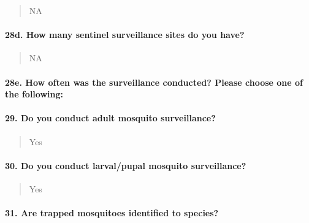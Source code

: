 \documentclass[
]{article}
\begin{document}
\begin{quote}
NA
\end{quote}

\hypertarget{d.-how-many-sentinel-surveillance-sites-do-you-have}{%
\paragraph{28d. How many sentinel surveillance sites do you
have?}\label{d.-how-many-sentinel-surveillance-sites-do-you-have}}

\begin{quote}
NA
\end{quote}

\hypertarget{e.-how-often-was-the-surveillance-conducted-please-choose-one-of-the-following}{%
\paragraph{28e. How often was the surveillance conducted? Please choose
one of the
following:}\label{e.-how-often-was-the-surveillance-conducted-please-choose-one-of-the-following}}

\begin{quote}
\end{quote}

\hypertarget{do-you-conduct-adult-mosquito-surveillance}{%
\paragraph{29. Do you conduct adult mosquito
surveillance?}\label{do-you-conduct-adult-mosquito-surveillance}}

\begin{quote}
Yes
\end{quote}

\hypertarget{do-you-conduct-larvalpupal-mosquito-surveillance}{%
\paragraph{30. Do you conduct larval/pupal mosquito
surveillance?}\label{do-you-conduct-larvalpupal-mosquito-surveillance}}

\begin{quote}
Yes
\end{quote}

\hypertarget{are-trapped-mosquitoes-identified-to-species}{%
\paragraph{31. Are trapped mosquitoes identified to
species?}\label{are-trapped-mosquitoes-identified-to-species}}
\end{document}
